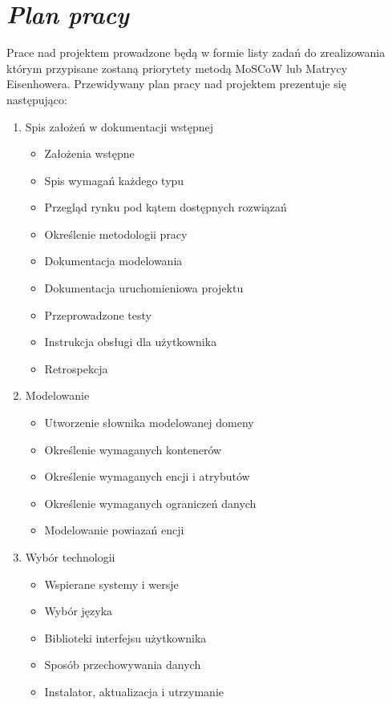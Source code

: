 \documentclass[a4paper,10pt]{report}
\newcommand{\customstylechapter}[1]{\large{\textit{#1}}}
\begin{document}
\chapter{\customstylechapter{Plan pracy}}
{Prace nad projektem prowadzone będą w formie listy zadań do zrealizowania 
którym przypisane zostaną priorytety metodą MoSCoW \cite{MOSCOW} lub Matrycy 
Eisenhowera. Przewidywany plan pracy nad projektem prezentuje się następująco:
\begin{enumerate}
    \item Spis założeń w dokumentacji wstępnej
    \begin{itemize}
        \item Założenia wstępne
        \item Spis wymagań każdego typu
        \item Przegląd rynku pod kątem dostępnych rozwiązań
        \item Określenie metodologii pracy
        \item Dokumentacja modelowania
        \item Dokumentacja uruchomieniowa projektu
        \item Przeprowadzone testy
        \item Instrukcja obsługi dla użytkownika
        \item Retrospekcja
    \end{itemize}
    \item Modelowanie 
    \begin{itemize}
        \item Utworzenie słownika modelowanej domeny
        \item Określenie wymaganych kontenerów
        \item Określenie wymaganych encji i atrybutów
        \item Określenie wymaganych ograniczeń danych
        \item Modelowanie powiazań encji
    \end{itemize}
    \item Wybór technologii
    \begin{itemize}
        \item Wspierane systemy i wersje
        \item Wybór języka
        \item Biblioteki interfejsu użytkownika
        \item Sposób przechowywania danych
        \item Instalator, aktualizacja i utrzymanie 

\end{itemize}
\end{enumerate}}
\end{document}
